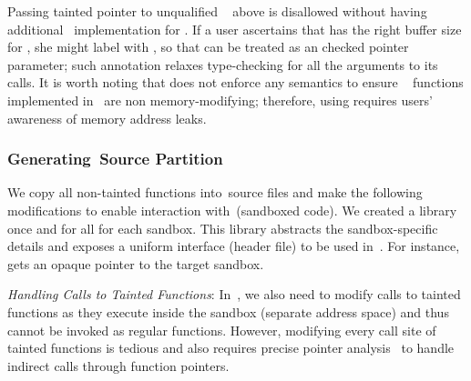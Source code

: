 Passing tainted pointer  to unqualified ~ above is disallowed without having additional ~\ucregion implementation for . If a user ascertains that  has the right buffer size for , she might label  with , so that  can be treated as an checked pointer parameter; such annotation relaxes type-checking for all the arguments to its calls. It is worth noting that \systemname does not enforce any semantics to ensure ~ functions implemented in ~\cregion are non memory-modifying; therefore, using  requires users' awareness of memory address leaks.

\subsubsection{Generating~\cregion Source Partition}
\label{subsub:gencregion}
We copy all non-tainted functions into~\cregion source files and make the following modifications to enable interaction with~\ucregion (\ie sandboxed code).
We created a library once and for all for each sandbox.
This library abstracts the sandbox-specific details and exposes a uniform interface (header file) to be used in~\cregion.
For instance,~ gets an opaque pointer to the target sandbox.

\iffalse
\noindent\emph{Handling Tainted Buffers in~\cregion}:
All buffers that are marked as tainted in~\cregion should be manually allocated in the sandbox. For instance,~\code{buff} in function~\code{handle_request} of~\lst{lst:final}.
We perform source rewriting and make the buffer into a pointer variable and allocate the corresponding number of bytes using the sandbox-specific allocator. For instance, we perform the following rewriting for~\code{buff} in~\lst{lst:final} with WASM sandbox.
\begin{verbatim}
- char buff[MAX_MSG_SIZE] __Tainted;
+ _TPtr<char> buff = (_TPtr<char>)t_malloc(MAX_MSG_SIZE);  
\end{verbatim}
Note that we also add the necessary deallocator calls at function exit points.
\fi

\noindent\emph{Handling Calls to Tainted Functions}:
In~\cregion, we also need to modify calls to tainted functions as they execute inside the sandbox (separate address space) and thus cannot be invoked as regular functions.
However, modifying every call site of tainted functions is tedious and also requires precise pointer analysis~\cite{milanova2002precise} to handle indirect calls through function pointers.

